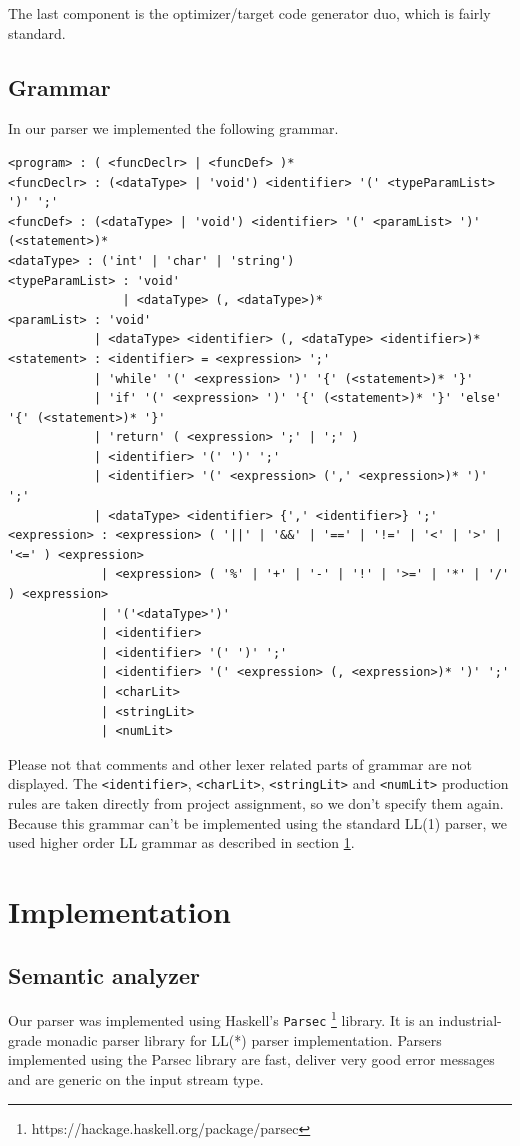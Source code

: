 \documentclass[titlepage]{article}
\begin{document}
The last component is the optimizer/target code generator duo, which is fairly standard.

\subsection{Grammar}
In our parser we implemented the following grammar.

\begin{verbatim}
<program> : ( <funcDeclr> | <funcDef> )*
<funcDeclr> : (<dataType> | 'void') <identifier> '(' <typeParamList> ')' ';'
<funcDef> : (<dataType> | 'void') <identifier> '(' <paramList> ')' (<statement>)*
<dataType> : ('int' | 'char' | 'string')
<typeParamList> : 'void'
                | <dataType> (, <dataType>)*			  
<paramList> : 'void'
            | <dataType> <identifier> (, <dataType> <identifier>)*		  
<statement> : <identifier> = <expression> ';'
            | 'while' '(' <expression> ')' '{' (<statement>)* '}'
            | 'if' '(' <expression> ')' '{' (<statement>)* '}' 'else' '{' (<statement>)* '}'
            | 'return' ( <expression> ';' | ';' )
            | <identifier> '(' ')' ';'
            | <identifier> '(' <expression> (',' <expression>)* ')' ';'
            | <dataType> <identifier> {',' <identifier>} ';'       
<expression> : <expression> ( '||' | '&&' | '==' | '!=' | '<' | '>' | '<=' ) <expression>
             | <expression> ( '%' | '+' | '-' | '!' | '>=' | '*' | '/' ) <expression>
             | '('<dataType>')'
             | <identifier>
             | <identifier> '(' ')' ';'
             | <identifier> '(' <expression> (, <expression>)* ')' ';'
             | <charLit>
             | <stringLit>
             | <numLit>          
\end{verbatim}

Please not that comments and other lexer related parts of grammar are not displayed.
The \texttt{<identifier>}, \texttt{<charLit>}, \texttt{<stringLit>} and \texttt{<numLit>}
production rules are taken directly from project assignment, so we don't specify them
again. Because this grammar can't be implemented using the standard LL(1) parser, we
used higher order LL grammar as described in section \ref{sec:implementation}. 

\section{Implementation}
\label{sec:implementation}

\subsection{Semantic analyzer}
Our parser was implemented using Haskell's \texttt{Parsec} 
\footnote{https://hackage.haskell.org/package/parsec} library. It is
an industrial-grade monadic parser library for LL(*) parser implementation. Parsers 
implemented using the Parsec library are fast, deliver very good error messages and
are generic on the input stream type.
\end{document}
